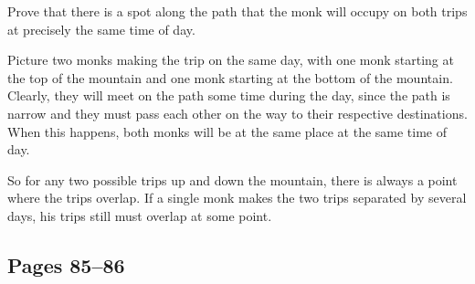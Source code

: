 \documentclass[letterpaper]{exam}
\begin{document}
\begin{questions}
    Prove that there is a spot along the path that the monk will occupy on both trips at precisely the same time of day.

    \begin{solution}

    Picture two monks making the trip on the same day, with one monk starting at the top of the mountain and one monk
    starting at the bottom of the mountain.  Clearly, they will meet on the path some time during the day, since the path is
    narrow and they must pass each other on the way to their respective destinations.  When this happens,
    both monks will be at the same place at the same time of day.  

    So for any two possible trips up and down the mountain, there is always a point where the trips overlap.  If a single
    monk makes the two trips separated by several days, his trips still must overlap at some point.

    \end{solution}

  \end{questions}
  \ifprintanswers{}

    \subsection{Pages 85--86} 
\end{document}
